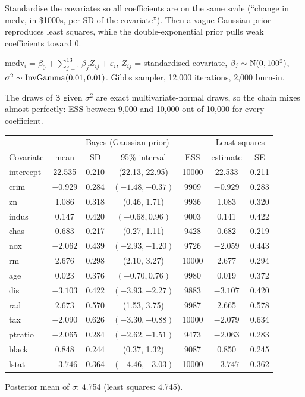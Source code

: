 \documentclass[11pt]{article}
\begin{document}
\begin{keyidea}
Standardise the covariates so all coefficients are on the same scale (``change in medv, in \$1000s, per SD of the covariate''). Then a vague Gaussian prior reproduces least squares, while the double-exponential prior pulls weak coefficients toward 0.
\end{keyidea}

\solution
{} $\text{medv}_i=\beta_0+\sum_{j=1}^{13}\beta_jZ_{ij}+\varepsilon_i$, $Z_{ij}$ = standardised covariate, $\beta_j\sim\mathrm{N}(0,100^2)$, $\sigma^2\sim\mathrm{InvGamma}(0.01,0.01)$. Gibbs sampler, 12{,}000 iterations, 2{,}000 burn-in.

 The draws of $\bm\beta$ given $\sigma^2$ are exact multivariate-normal draws, so the chain mixes almost perfectly: ESS between 9{,}000 and 10{,}000 out of 10{,}000 for every coefficient.

\begin{center}
\small
\begin{tabular}{lcccc|cc}\toprule
 & \multicolumn{4}{c|}{Bayes (Gaussian prior)} & \multicolumn{2}{c}{Least squares}\\
Covariate & mean & SD & 95\% interval & ESS & estimate & SE\\\midrule
intercept & 22.535 & 0.210 & (22.13, 22.95) & 10000 & 22.533 & 0.211\\
crim & $-0.929$ & 0.284 & $(-1.48,-0.37)$ & 9909 & $-0.929$ & 0.283\\
zn & 1.086 & 0.318 & (0.46, 1.71) & 9936 & 1.083 & 0.320\\
indus & 0.147 & 0.420 & $(-0.68, 0.96)$ & 9003 & 0.141 & 0.422\\
chas & 0.683 & 0.217 & (0.27, 1.11) & 9428 & 0.682 & 0.219\\
nox & $-2.062$ & 0.439 & $(-2.93,-1.20)$ & 9726 & $-2.059$ & 0.443\\
rm & 2.676 & 0.298 & (2.10, 3.27) & 10000 & 2.677 & 0.294\\
age & 0.023 & 0.376 & $(-0.70, 0.76)$ & 9980 & 0.019 & 0.372\\
dis & $-3.103$ & 0.422 & $(-3.93,-2.27)$ & 9883 & $-3.107$ & 0.420\\
rad & 2.673 & 0.570 & (1.53, 3.75) & 9987 & 2.665 & 0.578\\
tax & $-2.090$ & 0.626 & $(-3.30,-0.88)$ & 10000 & $-2.079$ & 0.634\\
ptratio & $-2.065$ & 0.284 & $(-2.62,-1.51)$ & 9473 & $-2.063$ & 0.283\\
black & 0.848 & 0.244 & (0.37, 1.32) & 9087 & 0.850 & 0.245\\
lstat & $-3.746$ & 0.364 & $(-4.46,-3.03)$ & 10000 & $-3.747$ & 0.362\\\bottomrule
\end{tabular}
\end{center}
Posterior mean of $\sigma$: 4.754 (least squares: 4.745).
\end{document}
